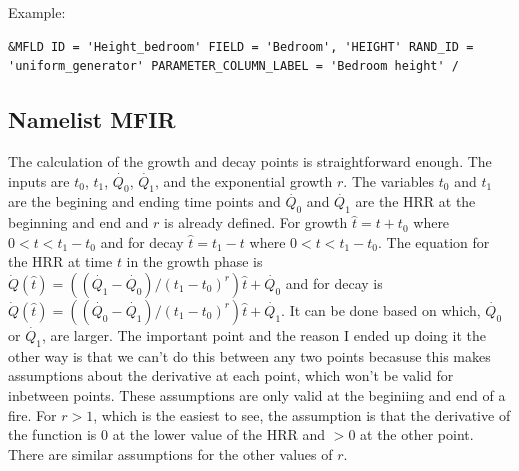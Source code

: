 \documentclass[12pt,twoside]{book}
\begin{document}
\vspace{\baselineskip}
\noindent Example:
\begin{lstlisting}
&MFLD ID = 'Height_bedroom' FIELD = 'Bedroom', 'HEIGHT' RAND_ID = 'uniform_generator' PARAMETER_COLUMN_LABEL = 'Bedroom height' /
\end{lstlisting}

\clearpage

\subsection{Namelist MFIR}

The calculation of the growth and decay points is straightforward enough. The inputs are $t_0$, $t_1$, $\dot{Q_0}$, $\dot{Q_1}$, and the exponential growth $r$. The variables $t_0$ and $t_1$ are the begining and ending time points and $\dot{Q_0}$ and $\dot{Q_1}$ are the HRR at the beginning and end and $r$ is already defined. For growth $\hat{t} = t + t_0$ where $0<t<t_1 - t_0$ and for decay $\hat{t} = t_1 - t$ where $0<t<t_1 - t_0$. The equation for the HRR at time $t$ in the growth phase is $\dot{Q}(\hat{t}) = ((\dot{Q_1} - \dot{Q_0})/(t_1-t_0)^r)\hat{t} + \dot{Q_0}$ and for decay is $\dot{Q}(\hat{t}) = ((\dot{Q_0} - \dot{Q_1})/(t_1-t_0)^r)\hat{t} + \dot{Q_1}$. It can be done based on which, $\dot{Q_0}$ or $\dot{Q_1}$, are larger. The important point and the reason I ended up doing it the other way is that we can't do this between any two points becasuse this makes assumptions about the derivative at each point, which won't be valid for inbetween points. These assumptions are only valid at the beginiing and end of a fire. For $r>1$, which is the easiest to see, the assumption is that the derivative of the function is $0$ at the lower value of the HRR and $>0$ at the other point. There are similar assumptions for the other values of $r$. 
\end{document}
